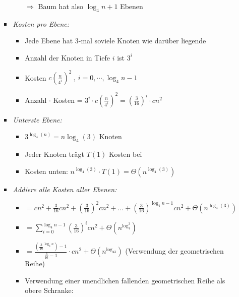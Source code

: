 \documentclass[
    ngerman,
    color=3b,
    load_common, %
    summary,
    boxarc,
]{tuda_summary}
\begin{document}
\begin{itemize}
\begin{itemize}
\begin{itemize}
\begin{itemize}
                                        $\Rightarrow$ Baum hat also $\log_4n + 1$ Ebenen
                              \end{itemize}
                        \item \textit{Kosten pro Ebene:}
                              \begin{itemize}
                                  \item Jede Ebene hat 3-mal soviele Knoten wie darüber liegende
                                  \item Anzahl der Knoten in Tiefe $i$ ist $3^i$
                                  \item Kosten $c(\frac{n}{4^i})^2~,~i=0,\cdots, \log_4n-1$
                                  \item Anzahl $\cdot$ Kosten = $3^i \cdot c(\frac{n}{4^i})^2 = (\frac{3}{16})^i \cdot cn^2$
                              \end{itemize}
                        \item \textit{Unterste Ebene:}
                              \begin{itemize}
                                  \item $3^{\log_4(n)} = n  {\log_4(3)}$ Knoten
                                  \item Jeder Knoten trägt $T(1)$ Kosten bei
                                  \item Kosten unten: $n^{\log_4(3)} \cdot T(1) = \Theta(n^{\log_4(3)})$
                              \end{itemize}
                        \item \textit{Addiere alle Kosten aller Ebenen:}
                              \begin{itemize}
                                  \item {} $= cn^2 + \frac{3}{16}cn^2 + (\frac{3}{16})^2cn^2+...+ (\frac{3}{16})^{\log_4n-1}cn^2 + \Theta(n^{\log_4(3)})$
                                  \item[] {\makebox[0.75cm][l]{}} $= \sum^{\log_4n-1}_{i=0} (\frac{3}{16})^icn^2+ \Theta(n^{\log_4^3})$
                                  \item[] {\makebox[0.75cm][l]{}} $= \frac{(\frac{3}{16}^{\log_4n})-1}{\frac{3}{16}-1} \cdot cn^2 + \Theta(n^{\log_43})$ (Verwendung der geometrischen Reihe)
                                  \item Verwendung einer unendlichen fallenden geometrischen Reihe als obere Schranke:

\end{itemize}
\end{itemize}
\end{itemize}
\end{itemize}
\end{document}
